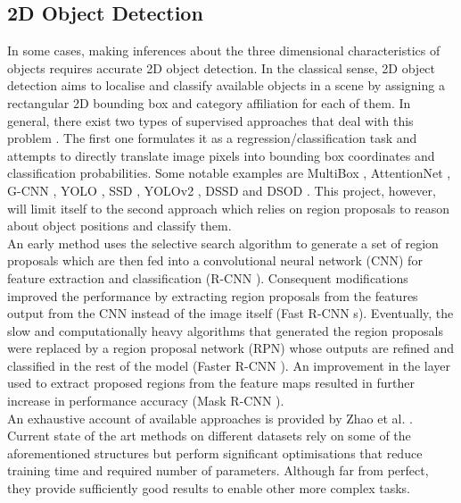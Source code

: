 \documentclass[main.tex]{subfiles}
\begin{document}
\subsection{2D Object Detection}
\indent In some cases, making inferences about the three dimensional characteristics of objects requires accurate 2D object detection. In the classical sense, 2D object detection aims to localise and classify available objects in a scene by assigning a rectangular 2D bounding box and category affiliation for each of them. In general, there exist two types of supervised approaches that deal with this problem \cite{Zhao2019}. The first one formulates it as a regression/classification task and attempts to directly translate image pixels into bounding box coordinates and classification probabilities. Some notable examples are MultiBox \cite{Erhan2014}, AttentionNet \cite{Yoo2015}, G-CNN \cite{Najibi2016}, YOLO \cite{Redmon2016}, SSD \cite{Liu2016}, YOLOv2 \cite{Redmon2017}, DSSD \cite{Fu2017} and DSOD \cite{Shen2017}. This project, however, will limit itself to the second approach which relies on region proposals to reason about object positions and classify them. \\
\indent An early method uses the selective search algorithm \cite{Uijlings2013} to generate a set of region proposals which are then fed into a convolutional neural network (CNN) for feature extraction and classification (R-CNN \cite{Girshick2014}). Consequent modifications improved the performance by extracting region proposals from the features output from the CNN instead of the image itself (Fast R-CNN s\cite{Girshick2015}). Eventually, the slow and computationally heavy algorithms that generated the region proposals were replaced by a region proposal network (RPN) whose outputs are refined and classified in the rest of the model (Faster R-CNN \cite{Ren2017}). An improvement in the layer used to extract proposed regions from the feature maps resulted in further increase in performance accuracy (Mask R-CNN \cite{He2017}). \\
\indent An exhaustive account of available approaches is provided by Zhao et al. \cite{Zhao2019}. Current state of the art methods on different datasets rely on some of the aforementioned structures but perform significant optimisations that reduce training time and required number of parameters. Although far from perfect, they provide sufficiently good results to enable other more complex tasks.
\end{document}
